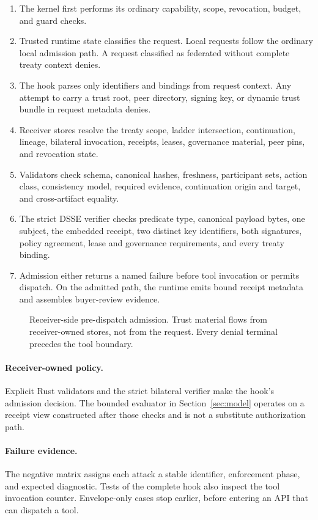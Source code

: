 \begin{enumerate}[noitemsep,topsep=2pt,leftmargin=1.4em]
  \item The kernel first performs its ordinary capability, scope, revocation, budget, and guard checks.
  \item Trusted runtime state classifies the request. Local requests follow
  the ordinary local admission path. A request classified as federated without
  complete treaty context denies.
  \item The hook parses only identifiers and bindings from request context. Any attempt to carry a trust root, peer directory, signing key, or dynamic trust bundle in request metadata denies.
  \item Receiver stores resolve the treaty scope, ladder intersection, continuation, lineage, bilateral invocation, receipts, leases, governance material, peer pins, and revocation state.
  \item Validators check schema, canonical hashes, freshness, participant sets, action class, consistency model, required evidence, continuation origin and target, and cross-artifact equality.
  \item The strict DSSE verifier checks predicate type, canonical payload bytes, one subject, the embedded receipt, two distinct key identifiers, both signatures, policy agreement, lease and governance requirements, and every treaty binding.
  \item Admission either returns a named failure before tool invocation or permits dispatch. On the admitted path, the runtime emits bound receipt metadata and assembles buyer-review evidence.
\end{enumerate}

\begin{figure}[t]
  \centering
  \resizebox{\columnwidth}{!}{}
  \caption{Receiver-side pre-dispatch admission. Trust material flows from receiver-owned stores, not from the request. Every denial terminal precedes the tool boundary.}
  \label{fig:admission}
\end{figure}

\paragraph{Receiver-owned policy.}
Explicit Rust validators and the strict bilateral verifier make the hook's
admission decision. The bounded evaluator in Section~\ref{sec:model} operates
on a receipt view constructed after those checks and is not a substitute
authorization path.

\paragraph{Failure evidence.}
The negative matrix assigns each attack a stable identifier, enforcement
phase, and expected diagnostic. Tests of the complete hook also inspect the
tool invocation counter. Envelope-only cases stop earlier, before entering an
API that can dispatch a tool.
